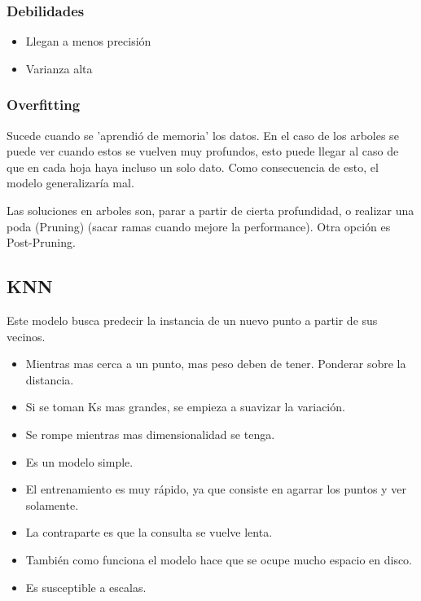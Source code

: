 \documentclass[titlepage,a4paper]{article}
\begin{document}
\subsubsection*{Debilidades}

\begin{itemize}
    \item Llegan a menos precisión
    \item Varianza alta
\end{itemize}

\subsubsection*{Overfitting}

Sucede cuando se 'aprendió de memoria' los datos. En el caso de los arboles se puede ver cuando estos se vuelven muy profundos, esto puede llegar al caso de que en cada hoja haya incluso un solo dato. Como consecuencia de esto, el modelo generalizaría mal.

Las soluciones en arboles son, parar a partir de cierta profundidad, o realizar una poda (Pruning)  (sacar ramas cuando mejore la performance). Otra opción es Post-Pruning.

\newpage

\subsection{KNN}
Este modelo busca predecir la instancia de un nuevo punto a partir de sus vecinos.

\begin{itemize}
    \item Mientras mas cerca a un punto, mas peso deben de tener. Ponderar sobre la distancia.
    \item Si se toman Ks mas grandes, se empieza a suavizar la variación.
    \item Se rompe mientras mas dimensionalidad se tenga.
    \item Es un modelo simple.
    \item El entrenamiento es muy rápido, ya que consiste en agarrar los puntos y ver solamente.
    \item La contraparte es que la consulta se vuelve lenta.
    \item También como funciona el modelo hace que se ocupe mucho espacio en disco.
    \item Es susceptible a escalas.
\end{itemize}
\end{document}
